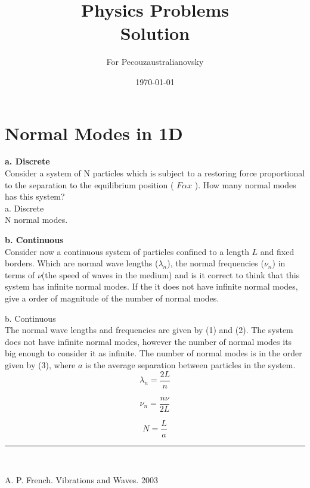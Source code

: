 \documentclass{article}
\begin{document}
\title{Physics Problems\\ Solution} %



\author{ For Pecouzaustralianovsky} %

\date{\today}
\maketitle







\section{Normal Modes in 1D}

\textbf{a. Discrete}\\

Consider a system of N particles which is subject to a restoring force proportional to the separation to the equilibrium position ( $ F \alpha x $ ). How many normal modes has this system?\\

{\color{green} a. Discrete\\

N normal modes.\\


}


\textbf{b. Continuous }\\

Consider now a continuous system of particles confined to a length $L$ and fixed borders. Which are normal wave lengths ($\lambda_n$), the normal frequencies  ($\nu_n$) in terms of $\nu$(the speed of waves in the medium) and is it correct to think that this system has infinite normal modes. If the it does not have infinite normal modes, give a order of magnitude of the number of normal modes.

{\color{green} b. Continuous \\

The normal wave lengths and frequencies are given by (1) and (2). The system does not have infinite normal modes, however the number of normal modes its big enough to consider it as infinite. The number of normal modes is in the order given by (3), where $a$ is the average separation between particles in the system. \\

\begin{equation}
\lambda_n = \frac{2L}{n}
\end{equation}

\begin{equation}
\nu_n = \frac{n \nu}{2L} 
\end{equation}

\begin{equation}
N = \frac{L}{a}
\end{equation}

}


\vspace{2mm}

\begin{center}
         \noindent\rule{8cm}{0.4pt}\\

\end{center}

\noindent [1] A. P. French. Vibrations and Waves. 2003
\end{document}
